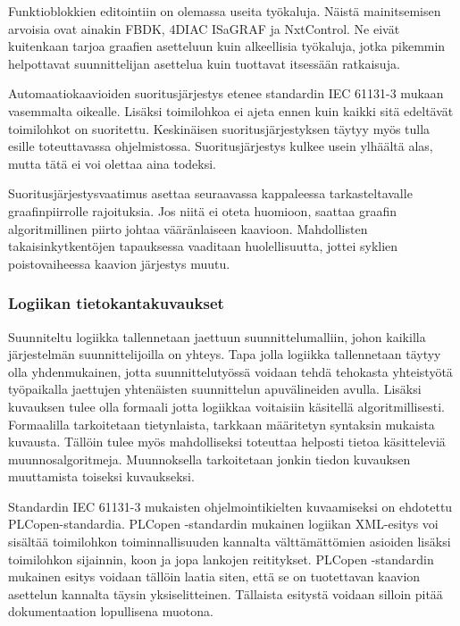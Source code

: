 \documentclass[finnish,12pt]{article}
\begin{document}
Funktioblokkien editointiin on olemassa useita työkaluja.
Näistä mainitsemisen arvoisia ovat ainakin FBDK, 4DIAC ISaGRAF ja NxtControl.
Ne eivät kuitenkaan tarjoa graafien asetteluun kuin alkeellisia työkaluja, jotka pikemmin helpottavat suunnittelijan asettelua kuin tuottavat itsessään ratkaisuja.

Automaatiokaavioiden suoritusjärjestys etenee standardin IEC 61131-3 mukaan vasemmalta oikealle.
Lisäksi toimilohkoa ei ajeta ennen kuin kaikki sitä edeltävät toimilohkot on suoritettu.
Keskinäisen suoritusjärjestyksen täytyy myös tulla esille toteuttavassa ohjelmistossa.
Suoritusjärjestys kulkee usein ylhäältä alas, mutta tätä ei voi olettaa aina todeksi. \cite{RefWorks:62}

Suoritusjärjestysvaatimus asettaa seuraavassa kappaleessa tarkasteltavalle graafinpiirrolle rajoituksia.
Jos niitä ei oteta huomioon, saattaa graafin algoritmillinen piirto johtaa vääränlaiseen kaavioon.
Mahdollisten takaisinkytkentöjen tapauksessa vaaditaan huolellisuutta, jottei syklien poistovaiheessa kaavion järjestys muutu.


		\subsubsection{Logiikan tietokantakuvaukset}

Suunniteltu logiikka tallennetaan jaettuun suunnittelumalliin, johon kaikilla järjestelmän suunnittelijoilla on yhteys.
Tapa jolla logiikka tallennetaan täytyy olla yhdenmukainen, jotta suunnittelutyössä voidaan tehdä tehokasta yhteistyötä työpaikalla jaettujen yhtenäisten suunnittelun apuvälineiden avulla.
Lisäksi kuvauksen tulee olla formaali jotta logiikkaa voitaisiin käsitellä algoritmillisesti.
Formaalilla tarkoitetaan tietynlaista, tarkkaan määritetyn syntaksin mukaista kuvausta.
Tällöin tulee myös mahdolliseksi toteuttaa helposti tietoa käsitteleviä muunnosalgoritmeja.
Muunnoksella tarkoitetaan jonkin tiedon kuvauksen muuttamista toiseksi kuvaukseksi.

Standardin IEC 61131-3 mukaisten ohjelmointikielten kuvaamiseksi on ehdotettu PLCopen-standardia.
PLCopen -standardin mukainen logiikan XML-esitys voi sisältää toimilohkon toiminnallisuuden kannalta välttämättömien asioiden lisäksi toimilohkon sijainnin, koon ja jopa lankojen reititykset.
PLCopen -standardin mukainen esitys voidaan tällöin laatia siten, että se on tuotettavan kaavion asettelun kannalta täysin yksiselitteinen.
Tällaista esitystä voidaan silloin pitää dokumentaation lopullisena muotona. \cite{RefWorks:64}
\end{document}
